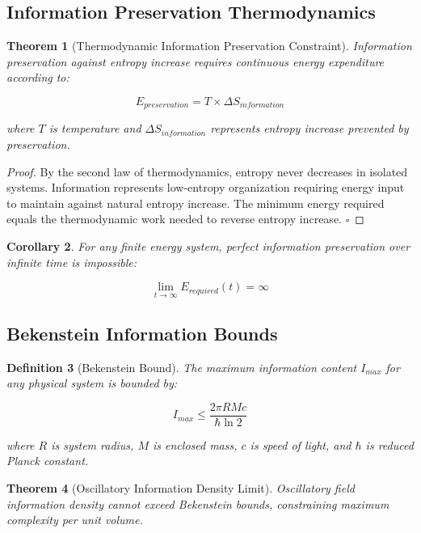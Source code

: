 \documentclass[11pt]{article}
\newtheorem{theorem}{Theorem}[section]
\newtheorem{corollary}[theorem]{Corollary}
\newtheorem{definition}[theorem]{Definition}
\theoremstyle{remark}
\begin{document}
\subsection{Information Preservation Thermodynamics}

\begin{theorem}[Thermodynamic Information Preservation Constraint]
Information preservation against entropy increase requires continuous energy expenditure according to:

$$E_{preservation} = T \times \Delta S_{information}$$

where $T$ is temperature and $\Delta S_{information}$ represents entropy increase prevented by preservation.
\end{theorem}

\begin{proof}
By the second law of thermodynamics, entropy never decreases in isolated systems. Information represents low-entropy organization requiring energy input to maintain against natural entropy increase. The minimum energy required equals the thermodynamic work needed to reverse entropy increase. $\square$
\end{proof}

\begin{corollary}
For any finite energy system, perfect information preservation over infinite time is impossible:

$$\lim_{t \to \infty} E_{required}(t) = \infty$$
\end{corollary}

\subsection{Bekenstein Information Bounds}

\begin{definition}[Bekenstein Bound]
The maximum information content $I_{max}$ for any physical system is bounded by:

$$I_{max} \leq \frac{2\pi RM c}{\hbar \ln 2}$$

where $R$ is system radius, $M$ is enclosed mass, $c$ is speed of light, and $\hbar$ is reduced Planck constant.
\end{definition}

\begin{theorem}[Oscillatory Information Density Limit]
Oscillatory field information density cannot exceed Bekenstein bounds, constraining maximum complexity per unit volume.
\end{theorem}
\end{document}
